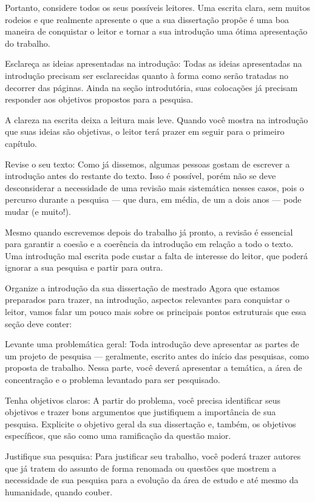 Portanto, considere todos os seus possíveis leitores. Uma escrita clara, sem muitos rodeios e que realmente apresente o que a sua dissertação propõe é uma boa maneira de conquistar o leitor e tornar a sua introdução uma ótima apresentação do trabalho.

Esclareça as ideias apresentadas na introdução: Todas as ideias apresentadas na introdução precisam ser esclarecidas quanto à forma como serão tratadas no decorrer das páginas. Ainda na seção introdutória, suas colocações já precisam responder aos objetivos propostos para a pesquisa.

A clareza na escrita deixa a leitura mais leve. Quando você mostra na introdução que suas ideias são objetivas, o leitor terá prazer em seguir para o primeiro capítulo.

Revise o seu texto: Como já dissemos, algumas pessoas gostam de escrever a introdução antes do restante do texto. Isso é possível, porém não se deve desconsiderar a necessidade de uma revisão mais sistemática nesses casos, pois o percurso durante a pesquisa — que dura, em média, de um a dois anos — pode mudar (e muito!).

Mesmo quando escrevemos depois do trabalho já pronto, a revisão é essencial para garantir a coesão e a coerência da introdução em relação a todo o texto. Uma introdução mal escrita pode custar a falta de interesse do leitor, que poderá ignorar a sua pesquisa e partir para outra.

Organize a introdução da sua dissertação de mestrado
Agora que estamos preparados para trazer, na introdução, aspectos relevantes para conquistar o leitor, vamos falar um pouco mais sobre os principais pontos estruturais que essa seção deve conter:

Levante uma problemática geral: Toda introdução deve apresentar as partes de um projeto de pesquisa — geralmente, escrito antes do início das pesquisas, como proposta de trabalho. Nessa parte, você deverá apresentar a temática, a área de concentração e o problema levantado para ser pesquisado.

Tenha objetivos claros: A partir do problema, você precisa identificar seus objetivos e trazer bons argumentos que justifiquem a importância de sua pesquisa. Explicite o objetivo geral da sua dissertação e, também, os objetivos específicos, que são como uma ramificação da questão maior.

Justifique sua pesquisa: Para justificar seu trabalho, você poderá trazer autores que já tratem do assunto de forma renomada ou questões que mostrem a necessidade de sua pesquisa para a evolução da área de estudo e até mesmo da humanidade, quando couber.

